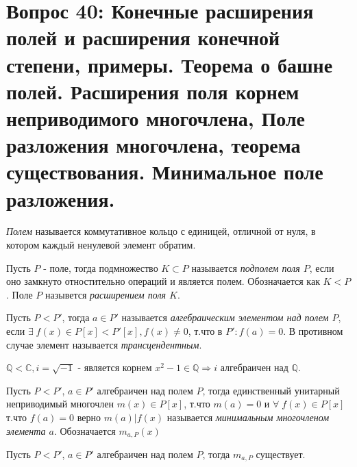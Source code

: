 \section{Вопрос 40: Конечные расширения полей и расширения конечной степени, примеры. Теорема о башне полей. Расширения поля корнем неприводимого многочлена, Поле разложения многочлена, теорема существования. Минимальное поле разложения.
}

\begin{defs}[Поле]
  \textit{Полем} называется коммутативное кольцо с единицей, отличной от нуля, в котором каждый ненулевой элемент обратим.
\end{defs}

\begin{defs}[Подполе]
  Пусть $P$ - поле, тогда подмножество $K \subset P$ называется \textit{подполем поля $P$}, если оно замкнуто отностительно операций и является полем.
  Обозначается как $K < P$.
  Поле $P$ назывется \textit{расширением поля $K$}.
\end{defs}

\begin{defs}
  Пусть $P < P'$, тогда $a \in P'$ называется \textit{алгебраическим элементом над полем $P$}, если $\exists\; f(x) \in P[x] < P'[x], f(x) \neq 0$, т.что в $P':f(a) = 0$. В противном случае элемент называется \textit{трансцендентным}.
\end{defs}

\begin{example}
    $\mathbb{Q}<\mathbb{C}, i = \sqrt{-1}$ - является корнем $x^2 - 1 \in \mathbb{Q} \Rightarrow i$ алгебраичен над $\mathbb{Q}$.
\end{example}

\begin{defs}
  Пусть $P < P'$,  $a \in P'$ алгебраичен над полем $P$, тогда единственный унитарный неприводимый многочлен
  $m(x) \in P[x]$, т.что $ m(a) = 0$ и $\forall \; f(x) \in P[x]$ т.что $f(a) = 0 $ верно $m(a) | f(x) $ называется \textit{минимальным многочленом элемента $a$}.
  Обозначается $m_{a,P}(x)$
\end{defs}

\begin{proofs}
	Пусть $P < P'$,  $a \in P'$ алгебраичен над полем $P$, тогда $m_{a,P}$ существует.
\end{proofs}

